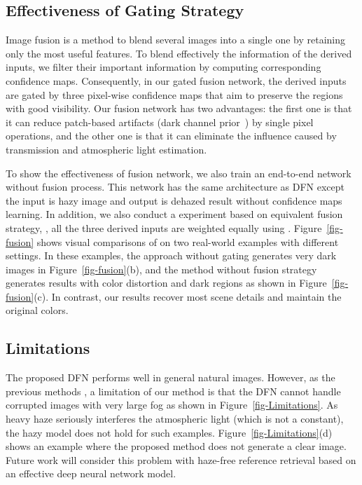 \documentclass[10pt,twocolumn,letterpaper]{article}
\begin{document}
\subsection{Effectiveness of Gating Strategy}
\label{sec-fusion}
Image fusion is a method to blend several images into a single one by
retaining only the most useful features.
To blend effectively the information of the derived inputs, we filter their important information by computing corresponding confidence maps.
Consequently, in our gated fusion network, the derived inputs
are gated by three pixel-wise confidence maps that aim to preserve the regions with
good visibility.
Our fusion network has two advantages:
the first one is that it can reduce patch-based artifacts (\eg dark channel prior~\cite{he2011singlecvpr})
by single pixel operations, and the other one is that it can eliminate the
influence caused by transmission and atmospheric light estimation.



To show the effectiveness of fusion network, we also train an end-to-end network without fusion process. This network has the same architecture as DFN except the input is hazy image and output is dehazed result without confidence maps learning.
In addition, we also conduct a experiment based on equivalent fusion strategy, \ie, all the three derived inputs are weighted equally using .
Figure~\ref{fig-fusion} shows visual comparisons of on two real-world examples with different settings. In these examples, the approach without gating generates very dark images in Figure~\ref{fig-fusion}(b), and the method without fusion strategy generates results with color distortion and dark regions as shown in Figure~\ref{fig-fusion}(c).
In contrast, our results recover most scene details and maintain the original
colors.


\subsection{Limitations}
The proposed DFN performs well in general natural images.
However, as the previous methods \cite{ren2016single,cai2016dehazenet}, a limitation of our method
is that the DFN cannot handle corrupted images with very large fog as shown
in Figure~\ref{fig-Limitations}.
As heavy haze seriously interferes the atmospheric light (which is not a constant), the hazy model does not hold for such examples.
Figure~\ref{fig-Limitations}(d) shows an example where the proposed method does not generate a clear image.
Future work will consider this problem with haze-free reference retrieval based on an effective deep neural network model.
\end{document}
